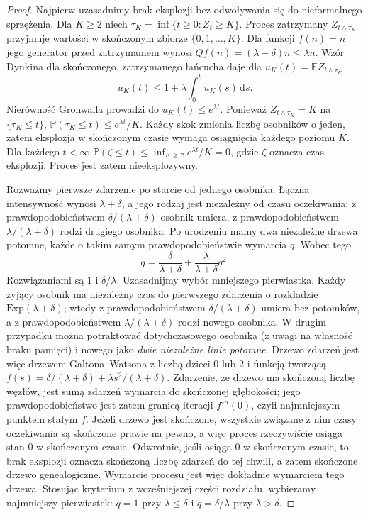 \documentclass[11pt,a4paper,oneside]{report}
\numberwithin{equation}{chapter}
\theoremstyle{plain}
\theoremstyle{definition}
\theoremstyle{remark}
\newcommand{\Prob}{\mathbb{P}}
\newcommand{\E}{\mathbb{E}}
\newcommand{\dd}{\mathrm{d}}
\begin{document}
\begin{proof}
Najpierw uzasadnimy brak eksplozji bez odwoływania się do
nieformalnego sprzężenia. Dla $K\ge2$ niech
$\tau_K=\inf\{t\ge0:Z_t\ge K\}$. Proces zatrzymany
$Z_{t\wedge\tau_K}$ przyjmuje wartości w skończonym
zbiorze $\{0,1,\ldots,K\}$. Dla funkcji $f(n)=n$
jego generator przed zatrzymaniem wynosi
$Qf(n)=(\lambda-\delta)n\le\lambda n$.
Wzór Dynkina dla skończonego, zatrzymanego łańcucha
daje dla $u_K(t)=\E Z_{t\wedge\tau_K}$
\[
u_K(t)\le1+\lambda\int_0^tu_K(s)\,\dd s.
\]
Nierówność Gronwalla prowadzi do
$u_K(t)\le e^{\lambda t}$. Ponieważ
$Z_{t\wedge\tau_K}=K$ na $\{\tau_K\le t\}$,
$\Prob(\tau_K\le t)\le e^{\lambda t}/K$.
Każdy skok zmienia liczbę osobników o jeden, zatem
eksplozja w skończonym czasie wymaga osiągnięcia
każdego poziomu $K$. Dla każdego $t<\infty$
$\Prob(\zeta\le t)\le\inf_{K\ge2}e^{\lambda t}/K=0$,
gdzie $\zeta$ oznacza czas eksplozji. Proces jest zatem
nieeksplozywny.

Rozważmy pierwsze zdarzenie po starcie od jednego osobnika.
Łączna intensywność wynosi $\lambda+\delta$, a jego rodzaj
jest niezależny od czasu oczekiwania: z prawdopodobieństwem
$\delta/(\lambda+\delta)$ osobnik umiera, z prawdopodobieństwem
$\lambda/(\lambda+\delta)$ rodzi drugiego osobnika.
Po urodzeniu mamy dwa niezależne drzewa potomne, każde
o takim samym prawdopodobieństwie wymarcia $q$.
Wobec tego
\[
q=\frac{\delta}{\lambda+\delta}
+\frac{\lambda}{\lambda+\delta}q^2.
\]
Rozwiązaniami są $1$ i $\delta/\lambda$.
Uzasadnijmy wybór mniejszego pierwiastka. Każdy żyjący
osobnik ma niezależny czas do pierwszego zdarzenia
o rozkładzie $\mathrm{Exp}(\lambda+\delta)$; wtedy
z prawdopodobieństwem $\delta/(\lambda+\delta)$
umiera bez potomków, a z prawdopodobieństwem
$\lambda/(\lambda+\delta)$ rodzi nowego osobnika.
W drugim przypadku można potraktować dotychczasowego
osobnika (z uwagi na własność braku pamięci) i nowego
jako \emph{dwie niezależne linie potomne}. Drzewo
zdarzeń jest więc drzewem Galtona--Watsona z liczbą
dzieci $0$ lub $2$ i funkcją tworzącą
$f(s)=\delta/(\lambda+\delta)+\lambda s^2/(\lambda+\delta)$.
Zdarzenie, że drzewo ma skończoną liczbę węzłów,
jest sumą zdarzeń wymarcia do skończonej głębokości;
jego prawdopodobieństwo jest zatem granicą iteracji
$f^{\circ n}(0)$, czyli najmniejszym punktem stałym $f$.
Jeżeli drzewo jest skończone, wszystkie związane z nim
czasy oczekiwania są skończone prawie na pewno,
a więc proces rzeczywiście osiąga stan $0$ w skończonym
czasie. Odwrotnie, jeśli osiąga $0$ w skończonym czasie,
to brak eksplozji oznacza skończoną liczbę zdarzeń do tej
chwili, a zatem skończone drzewo genealogiczne.
Wymarcie procesu jest więc dokładnie wymarciem tego drzewa.
Stosując kryterium z wcześniejszej części rozdziału,
wybieramy najmniejszy pierwiastek: $q=1$ przy
$\lambda\le\delta$ i $q=\delta/\lambda$ przy
$\lambda>\delta$.
\end{proof}
\end{document}
